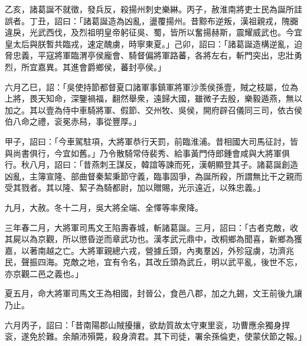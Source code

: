 \begin{pinyinscope}
 
 乙亥，諸葛誕不就徵，發兵反，殺揚州刺史樂綝。丙子，赦淮南將吏士民為誕所詿誤者。丁丑，詔曰：「諸葛誕造為凶亂，盪覆揚州。昔黥布逆叛，漢祖親戎，隗嚻違戾，光武西伐，及烈祖明皇帝躬征吳、蜀，皆所以奮揚赫斯，震耀威武也。今宜皇太后與朕暫共臨戎，速定醜虜，時寧東夏。」己卯，詔曰：「諸葛誕造構逆亂，迫脅忠義，平寇將軍臨渭亭侯龐會、騎督偏將軍路蕃，各將左右，斬門突出，忠壯勇烈，所宜嘉異。其進會爵鄉侯，蕃封亭侯。」
 
 
六月乙巳，詔：「吳使持節都督夏口諸軍事鎮軍將軍沙羡侯孫壹，賊之枝屬，位為上將，畏天知命，深鑒禍福，翻然舉衆，遠歸大國，雖微子去殷，樂毅遁燕，無以加之。其以壹為侍中車騎將軍、假節、交州牧、吳侯，開府辟召儀同三司，依古侯伯八命之禮，衮冕赤舄，事從豐厚。」
 
 
 
 
 甲子，詔曰：「今車駕駐項，大將軍恭行天罰，前臨淮浦。昔相國大司馬征討，皆與尚書俱行，今宜如舊。」乃令散騎常侍裴秀、給事黃門侍郎鍾會咸與大將軍俱行。秋八月，詔曰：「昔燕刺王謀反，韓誼等諫而死，漢朝顯登其子。諸葛誕創造凶亂，主簿宣隆、部曲督秦絜秉節守義，臨事固爭，為誕所殺，所謂無比干之親而受其戮者。其以隆、絜子為騎都尉，加以贈賜，光示遠近，以殊忠義。」
 
 
 
 
 九月，大赦。冬十二月，吳大將全端、全懌等率衆降。
 
 
 
 
 三年春二月，大將軍司馬文王陷壽春城，斬諸葛誕。三月，詔曰：「古者克敵，收其屍以為京觀，所以懲昏逆而章武功也。漢孝武元鼎中，改桐鄉為聞喜，新鄉為獲嘉，以著南越之亡。大將軍親總六戎，營據丘頭，內夷羣凶，外殄寇虜，功濟兆民，聲振四海。克敵之地，宜有令名，其改丘頭為武丘，明以武平亂，後世不忘，亦京觀二邑之義也。」
 
 
 
 
 夏五月，命大將軍司馬文王為相國，封晉公，食邑八郡，加之九錫，文王前後九讓乃止。
 
 
六月丙子，詔曰：「昔南陽郡山賊擾攘，欲劫質故太守東里衮，功曹應余獨身捍衮，遂免於難。余顛沛殞斃，殺身濟君。其下司徒，署余孫倫吏，使蒙伏節之報。」
 

\end{pinyinscope}
